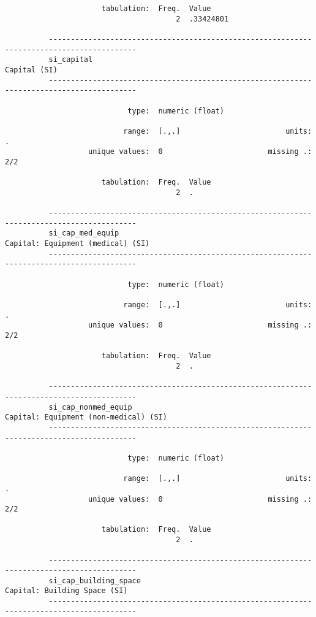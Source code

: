 \documentclass{article}
\begin{document}
\begin{verbatim}
                      tabulation:  Freq.  Value
                                       2  .33424801
          
          ------------------------------------------------------------------------------------------
          si_capital                                                                    Capital (SI)
          ------------------------------------------------------------------------------------------
          
                            type:  numeric (float)
          
                           range:  [.,.]                        units:  .
                   unique values:  0                        missing .:  2/2
          
                      tabulation:  Freq.  Value
                                       2  .
          
          ------------------------------------------------------------------------------------------
          si_cap_med_equip                                         Capital: Equipment (medical) (SI)
          ------------------------------------------------------------------------------------------
          
                            type:  numeric (float)
          
                           range:  [.,.]                        units:  .
                   unique values:  0                        missing .:  2/2
          
                      tabulation:  Freq.  Value
                                       2  .
          
          ------------------------------------------------------------------------------------------
          si_cap_nonmed_equip                                  Capital: Equipment (non-medical) (SI)
          ------------------------------------------------------------------------------------------
          
                            type:  numeric (float)
          
                           range:  [.,.]                        units:  .
                   unique values:  0                        missing .:  2/2
          
                      tabulation:  Freq.  Value
                                       2  .
          
          ------------------------------------------------------------------------------------------
          si_cap_building_space                                         Capital: Building Space (SI)
          ------------------------------------------------------------------------------------------
          

\end{verbatim}
\end{document}
